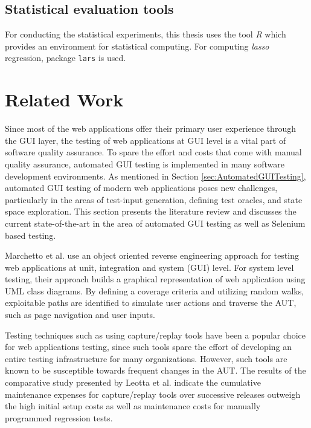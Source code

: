 \subsection*{Statistical evaluation tools}
For conducting the statistical experiments, this thesis uses the tool \textit{R} \cite{Rtool} which provides an environment for statistical computing. For computing \textit{lasso} regression, package \texttt{lars} \cite{larspack} is used. 
\section{Related Work}
\label{sec:relatedWork}

Since most of the web applications offer their primary user experience through the GUI layer, the testing of web applications at GUI level is a vital part of software quality assurance. To spare the effort and costs that come with manual quality assurance, automated GUI testing is implemented in many software development environments. As mentioned in Section \ref{sec:AutomatedGUITesting}, automated GUI testing of modern web applications poses new challenges, particularly in the areas of test-input generation, defining test oracles, and state space exploration. This section presents the literature review and discusses the current state-of-the-art in the area of automated GUI testing as well as Selenium\cite{websiteSelenium} based testing. 

Marchetto et al.\cite{Marchetto2006} use an object oriented reverse engineering approach for testing web applications at unit, integration and system (GUI) level. For system level testing, their approach builds a graphical representation of web application using UML class diagrams. By defining a coverage criteria and utilizing random walks, exploitable paths are identified to simulate user actions and traverse the AUT, such as page navigation and user inputs.

Testing techniques such as using capture/replay tools have been a popular choice for web applications testing, since such tools spare the effort of developing an entire testing infrastructure for many organizations. However, such tools are known to be susceptible towards frequent changes in the AUT\cite{sjosten2006costs}. The results of the comparative study presented by Leotta et al.\cite{leotta2013capture} indicate the cumulative maintenance expenses for capture/replay tools over successive releases outweigh the high initial setup costs as well as maintenance costs for manually programmed regression tests. 

